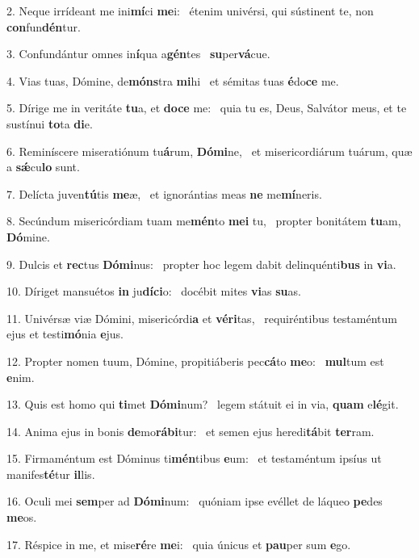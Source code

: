 2. Neque irrídeant me ini\textbf{mí}ci \textbf{me}i: \ast\  étenim univérsi, qui sústinent te, non \textbf{con}fun\textbf{dén}tur.\

3. Confundántur omnes in\textbf{í}qua a\textbf{gén}tes \ast\  \textbf{su}per\textbf{vá}cue.\

4. Vias tuas, Dómine, de\textbf{móns}tra \textbf{mi}hi \ast\  et sémitas tuas \textbf{é}do\textbf{ce} me.\

5. Dírige me in veritáte \textbf{tu}a, et \textbf{do}\textbf{ce} me: \ast\  quia tu es, Deus, Salvátor meus, et te sustínui \textbf{to}ta \textbf{di}e.\

6. Reminíscere miseratiónum tu\textbf{á}rum, \textbf{Dó}\textbf{mi}ne, \ast\  et misericordiárum tuárum, quæ a \textbf{sǽ}cu\textbf{lo} sunt.\

7. Delícta juven\textbf{tú}tis \textbf{me}æ, \ast\  et ignorántias meas \textbf{ne} me\textbf{mí}neris.\

8. Secúndum misericórdiam tuam me\textbf{mén}to \textbf{me}\textbf{i} tu, \ast\  propter bonitátem \textbf{tu}am, \textbf{Dó}mine.\

9. Dulcis et \textbf{rec}tus \textbf{Dó}\textbf{mi}nus: \ast\  propter hoc legem dabit delinquénti\textbf{bus} in \textbf{vi}a.\

10. Díriget mansuétos \textbf{in} ju\textbf{dí}\textbf{ci}o: \ast\  docébit mites \textbf{vi}as \textbf{su}as.\

11. Univérsæ viæ Dómini, misericórdi\textbf{a} et \textbf{vé}\textbf{ri}tas, \ast\  requiréntibus testaméntum ejus et testi\textbf{mó}nia \textbf{e}jus.\

12. Propter nomen tuum, Dómine, propitiáberis pec\textbf{cá}to \textbf{me}o: \ast\  \textbf{mul}tum est \textbf{e}nim.\

13. Quis est homo qui \textbf{ti}met \textbf{Dó}\textbf{mi}num? \ast\  legem státuit ei in via, \textbf{quam} e\textbf{lé}git.\

14. Anima ejus in bonis \textbf{de}mo\textbf{rá}\textbf{bi}tur: \ast\  et semen ejus heredi\textbf{tá}bit \textbf{ter}ram.\

15. Firmaméntum est Dóminus ti\textbf{mén}tibus \textbf{e}um: \ast\  et testaméntum ipsíus ut manifes\textbf{té}tur \textbf{il}lis.\

16. Oculi mei \textbf{sem}per ad \textbf{Dó}\textbf{mi}num: \ast\  quóniam ipse evéllet de láqueo \textbf{pe}des \textbf{me}os.\

17. Réspice in me, et mise\textbf{ré}re \textbf{me}i: \ast\  quia únicus et \textbf{pau}per sum \textbf{e}go.\

